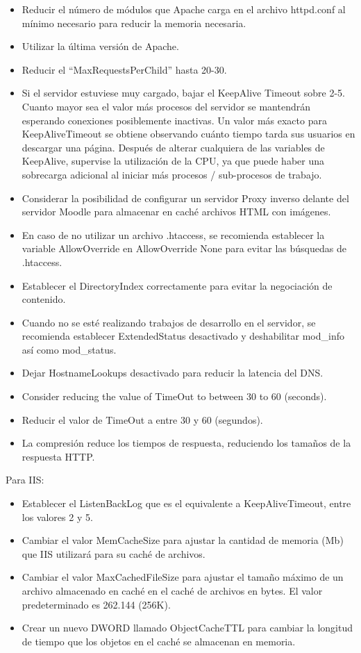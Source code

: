 \begin{itemize}
	\item Reducir el número de módulos que Apache carga en el archivo httpd.conf al mínimo necesario para reducir la memoria necesaria.
	\item Utilizar la última versión de Apache.
	\item Reducir el ``MaxRequestsPerChild'' hasta 20-30.
	\item Si el servidor estuviese muy cargado, bajar el KeepAlive Timeout sobre 2-5. Cuanto mayor sea el valor más procesos del servidor se mantendrán esperando conexiones posiblemente inactivas. Un valor más exacto para KeepAliveTimeout se obtiene observando cuánto tiempo tarda sus usuarios en descargar una página. Después de alterar cualquiera de las variables de KeepAlive, supervise la utilización de la CPU, ya que puede haber una sobrecarga adicional al iniciar más procesos / sub-procesos de trabajo.
	\item Considerar la posibilidad de configurar un servidor Proxy inverso delante del servidor Moodle para almacenar en caché archivos HTML con imágenes.
	\item En caso de no utilizar un archivo .htaccess, se recomienda establecer la variable AllowOverride en AllowOverride None para evitar las búsquedas de .htaccess.
	\item Establecer el DirectoryIndex correctamente para evitar la negociación de contenido.
	\item Cuando no se esté realizando trabajos de desarrollo en el servidor, se recomienda establecer ExtendedStatus desactivado y deshabilitar mod\_info así como mod\_status.
	\item Dejar HostnameLookups desactivado para reducir la latencia del DNS.
	\item Consider reducing the value of TimeOut to between 30 to 60 (seconds).
	\item Reducir el valor de TimeOut a entre 30 y 60 (segundos).
	\item La compresión reduce los tiempos de respuesta, reduciendo los tamaños de la respuesta HTTP.
\end{itemize}

Para IIS:
\begin{itemize}
	\item Establecer el ListenBackLog que es el equivalente a KeepAliveTimeout, entre los valores 2 y 5.
	\item Cambiar el valor MemCacheSize para ajustar la cantidad de memoria (Mb) que IIS utilizará para su caché de archivos.
	\item Cambiar el valor MaxCachedFileSize para ajustar el tamaño máximo de un archivo almacenado en caché en el caché de archivos en bytes. El valor predeterminado es 262.144 (256K).
	\item Crear un nuevo DWORD llamado ObjectCacheTTL para cambiar la longitud de tiempo que los objetos en el caché se almacenan en memoria.
\end{itemize}
\newpage
